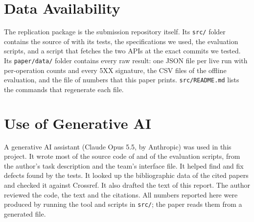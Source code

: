 \section*{Data Availability}
\label{sec:data}
The replication package is the submission repository itself. Its
\texttt{src/} folder contains the source of \tool with its tests, the
\NSpecs specifications we used, the evaluation scripts, and a script that
fetches the two APIs at the exact commits we tested. Its
\texttt{paper/data/} folder contains every raw result: one JSON file per live
run with per-operation counts and every 5XX signature, the CSV files of the
offline evaluation, and the file of numbers that this paper prints.
\texttt{src/README.md} lists the commands that regenerate each file.

\section*{Use of Generative AI}
A generative AI assistant (Claude Opus 5.5, by Anthropic) was used in this
project. It wrote most of the source code of \tool and of the evaluation
scripts, from the author's task description and the team's interface file.
It helped find and fix defects found by the tests. It looked up the
bibliographic data of the cited papers and checked it against Crossref. It
also drafted the text of this report. The author reviewed the code, the text and the
citations. All numbers reported here were produced by running the tool and
scripts in \texttt{src/}; the paper reads them from a generated file.
